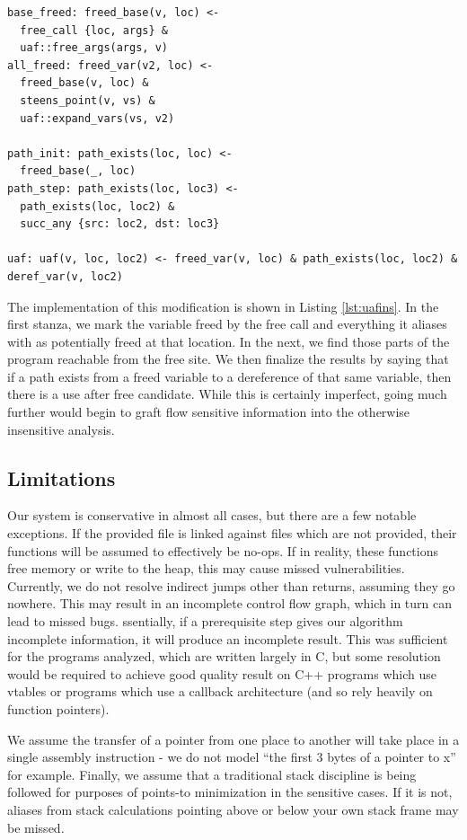 \begin{lstlisting}[label=lst:uafins, caption={Tracking Frees Insensitively}]
base_freed: freed_base(v, loc) <-
  free_call {loc, args} &
  uaf::free_args(args, v)
all_freed: freed_var(v2, loc) <-
  freed_base(v, loc) &
  steens_point(v, vs) &
  uaf::expand_vars(vs, v2)

path_init: path_exists(loc, loc) <-
  freed_base(_, loc)
path_step: path_exists(loc, loc3) <-
  path_exists(loc, loc2) &
  succ_any {src: loc2, dst: loc3}

uaf: uaf(v, loc, loc2) <- freed_var(v, loc) & path_exists(loc, loc2) & deref_var(v, loc2)
\end{lstlisting}

The implementation of this modification is shown in Listing \ref{lst:uafins}.
In the first stanza, we mark the variable freed by the free call and everything it aliases with as potentially freed at that location.
In the next, we find those parts of the program reachable from the free site.
We then finalize the results by saying that if a path exists from a freed variable to a dereference of that same variable, then there is a use after free candidate.
While this is certainly imperfect, going much further would begin to graft flow sensitive information into the otherwise insensitive analysis.

\subsection{Limitations}
Our system is conservative in almost all cases, but there are a few notable exceptions.
If the provided file is linked against files which are not provided, their functions will be assumed to effectively be no-ops.
If in reality, these functions free memory or write to the heap, this may cause missed vulnerabilities.
Currently, we do not resolve indirect jumps other than returns, assuming they go nowhere.
This may result in an incomplete control flow graph, which in turn can lead to missed bugs.
ssentially, if a prerequisite step gives our algorithm incomplete information, it will produce an incomplete result.
This was sufficient for the programs analyzed, which are written largely in C, but some resolution would be required to achieve good quality result on C++ programs which use vtables or programs which use a callback architecture (and so rely heavily on function pointers).

We assume the transfer of a pointer from one place to another will take place in a single assembly instruction - we do not model ``the first 3 bytes of a pointer to x'' for example.
Finally, we assume that a traditional stack discipline is being followed for purposes of points-to minimization in the sensitive cases.
If it is not, aliases from stack calculations pointing above or below your own stack frame may be missed.
